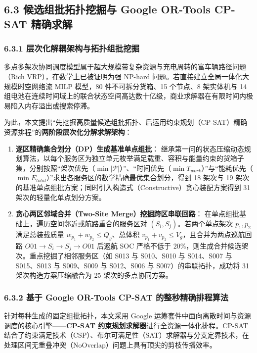 \documentclass[withoutpreface,bwprint]{format}
\begin{document}
\subsection{6.3 候选组批拓扑挖掘与 Google OR-Tools CP-SAT 精确求解}

\subsubsection{6.3.1 层次化解耦架构与拓扑组批挖掘}
多点多架次协同调度模型属于超大规模带复杂资源与充电周转的富车辆路径问题（Rich VRP），在数学上已被证明为强 NP-hard 问题\cite{schermer2019}。若直接建立全局一体化大规模时空网络流 MILP 模型，80 件不可拆分货箱、15 个节点、8 架实体机与 14 组电池在连续时间域上的联合状态空间高达数十亿级，商业求解器在有限时间内极易陷入内存溢出或搜索停滞。

为此，本文提出“先挖掘高质量候选组批拓扑、后运用约束规划（CP-SAT）精确资源排程”的\textbf{两阶段层次化分解求解架构}：
\begin{enumerate}[leftmargin=*]
    \item \textbf{逐区精确集合划分（DP）生成基准单点组批}：
    继承第一问的状态压缩动态规划算法，以每个服务区为独立单元枚举满足载重、容积与能量约束的货箱子集，分别按照“架次优先（$\min |\mathcal{P}|$）”、“时间优先（$\min T_{work}$）”与“能耗优先（$\min E_{total}$）”求出各服务区的数学精确最优集合划分，得到 18 架次与 19 架次的基准单点组批方案；同时引入构造式（Constructive）贪心装配方案得到 31 架次的轻量化单点划分方案。
    \item \textbf{贪心两区邻域合并（Two-Site Merge）挖掘跨区串联回路}：
    在单点组批基础上，遍历空间邻近或航路重合的服务区对 $(S_i, S_j)$。若两个单点架次 $p_1, p_2$ 满足总装载质量 $w_{p_1} + w_{p_2} \le Q_g$、总体积 $v_{p_1} + v_{p_2} \le V_g$，且合并为两点巡航回路 $O01 \to S_i \to S_j \to O01$ 后返航 SOC 严格不低于 $20\%$，则生成合并候选架次。重点挖掘了相邻服务区（如 S013 与 S010、S010 与 S014、S007 与 S015、S013 与 S009、S009 与 S012、S006 与 S007）的串联拓扑，成功将 31 架次构造方案压缩融合为 25 架次的多点协同方案。
\end{enumerate}

\subsubsection{6.3.2 基于 Google OR-Tools CP-SAT 的整秒精确排程算法}
针对每种生成的固定组批拓扑，本文采用 Google 运筹套件中面向离散时间与资源调度的核心引擎——\textbf{CP-SAT 约束规划求解器}进行全资源一体化排程。CP-SAT 结合了约束满足技术（CSP）、布尔可满足性（SAT）求解器与分支定界技术，在处理区间无重叠冲突（NoOverlap）问题上具有顶尖的剪枝传播效率\cite{laborie2018}。
\end{document}
